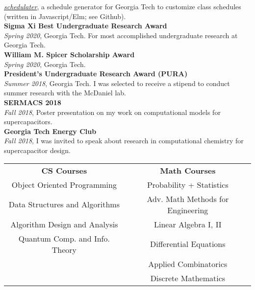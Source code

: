 \documentclass[fontsize=11pt]{tccv}
\begin{document}
\href{https://stnma7e.github.io/schedulater}{\emph{schedulater}}, a schedule generator for Georgia Tech to customize class schedules (written in Javascript/Elm; see Github).
\\

\textbf{Sigma Xi Best Undergraduate Research Award} \\
\emph{Spring 2020}, Georgia Tech. For most accomplished undergraduate research at Georgia Tech.
\\

\textbf{William M. Spicer Scholarship Award} \\
\emph{Spring 2020}, Georgia Tech. 
\\

\textbf{President's Undergraduate Research Award (PURA)} \\
\emph{Summer 2018}, Georgia Tech. I was selected to receive a stipend to conduct summer research with the McDaniel lab. 
\\

\textbf{SERMACS 2018} \\
\emph{Fall 2018}, Poster presentation on my work on computational models for supercapacitors.
\\

\textbf{Georgia Tech Energy Club} \\
\emph{Fall 2018}, I was invited to speak about research in computational chemistry for supercapacitor design.
\\
    
\begin{center}
\begin{tabular}{cc}
    \textbf{CS Courses}  & \textbf{Math Courses} \\
    Object Oriented Programming &  Probability + Statistics \\
    Data Structures and Algorithms &  Adv. Math Methods for Engineering \\
    Algorithm Design and Analysis &  Linear Algebra I, II \\
    Quantum Comp. and Info. Theory & Differential Equations \\
    
    & Applied Combinatorics \\
    & Discrete Mathematics \\
\end{tabular}
\end{center}
\end{document}
